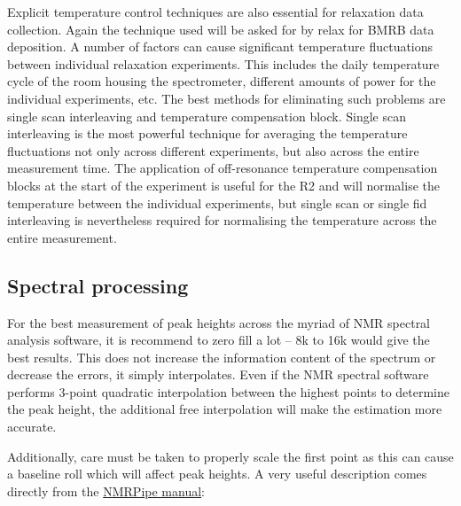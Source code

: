 Explicit temperature control techniques are also essential for relaxation data collection.
Again the technique used will be asked for by relax for BMRB data deposition.
A number of factors can cause significant temperature fluctuations between individual relaxation experiments.
This includes the daily temperature cycle of the room housing the spectrometer, different amounts of power for the individual experiments, etc.
The best methods for eliminating such problems are single scan interleaving and temperature compensation block.
Single scan interleaving is the most powerful technique for averaging the temperature fluctuations not only across different experiments, but also across the entire measurement time.
The application of off-resonance temperature compensation blocks at the start of the experiment is useful for the R2 and will normalise the temperature between the individual experiments, but single scan or single fid interleaving is nevertheless required for normalising the temperature across the entire measurement.



\subsection{Spectral processing}

For the best measurement of peak heights across the myriad of NMR spectral analysis software, it is recommend to zero fill a lot -- 8k to 16k would give the best results.
This does not increase the information content of the spectrum or decrease the errors, it simply interpolates.
Even if the NMR spectral software performs 3-point quadratic interpolation between the highest points to determine the peak height, the additional free interpolation will make the estimation more accurate.

Additionally, care must be taken to properly scale the first point as this can cause a baseline roll which will affect peak heights.
A very useful description comes directly from the \href{http://spin.niddk.nih.gov/NMRPipe/doc1/}{NMRPipe manual}:

